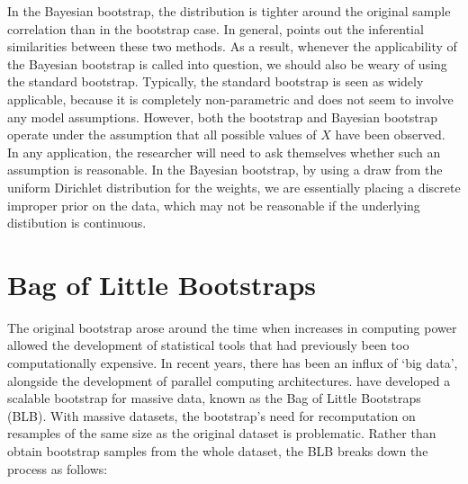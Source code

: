\documentclass{article}\usepackage[]{graphicx}\usepackage[]{color}
\begin{document}
In the Bayesian bootstrap, the distribution is tighter around the original sample correlation than in the bootstrap case. In general, \textcite{Rubin1981} points out the inferential similarities between these two methods. As a result, whenever the applicability of the Bayesian bootstrap is called into question, we should also be weary of using the standard bootstrap. Typically, the standard bootstrap is seen as widely applicable, because it is completely non-parametric and does not seem to involve any model assumptions. However, both the bootstrap and Bayesian bootstrap operate under the assumption that all possible values of $X$ have been observed. In any application, the researcher will need to ask themselves whether such an assumption is reasonable. In the Bayesian bootstrap, by using a draw from the uniform Dirichlet distribution for the weights, we are essentially placing a discrete improper prior on the data, which may not be reasonable if the underlying distibution is continuous.




\section{Bag of Little Bootstraps}
The original bootstrap arose around the time when increases in computing power allowed the development of statistical tools that had previously been too computationally expensive. In recent years, there has been an influx of `big data', alongside the development of parallel computing architectures. \textcite{Kleiner2014} have developed a scalable bootstrap for massive data, known as the Bag of Little Bootstraps (BLB). With massive datasets, the bootstrap's need for recomputation on resamples of the same size as the original dataset is problematic. Rather than obtain bootstrap samples from the whole dataset, the BLB breaks down the process as follows:
\end{document}
